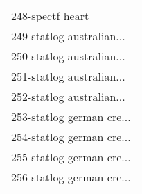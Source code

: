 \begin{table}[h]
\begin{center}
\begin{tabular}{l}
248-spectf heart &  \\
249-statlog australian... &  \\
250-statlog australian... &  \\
251-statlog australian... &  \\
252-statlog australian... &  \\ \hline
253-statlog german cre... &  \\
254-statlog german cre... &  \\
255-statlog german cre... &  \\
256-statlog german cre... &  \\\end{tabular}\label{stratsALCKappa7AllReduxhalfb}
\end{center}
\end{table}

